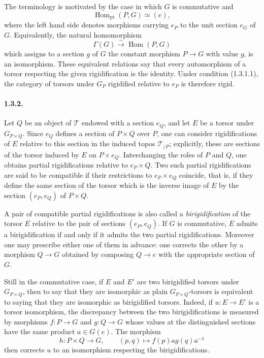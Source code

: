 \documentclass[11pt]{article}
\theoremstyle{plain}
\theoremstyle{definition}
\theoremstyle{remark}
\DeclareMathOperator{\Hom}{Hom}
\begin{document}
The terminology is motivated by the case in which $G$ is commutative and
\begin{equation}
\Hom_{\mathrm{pt}}(P,G)\simeq (e),
\tag{1.3.1.1}
\end{equation}
where the left hand side denotes morphisms carrying $e_P$ to the unit section $e_G$ of $G$. Equivalently, the natural homomorphism
\begin{equation}
\Gamma(G)\xrightarrow{\sim}\Hom(P,G)
\tag{1.3.1.2}
\end{equation}
which assigns to a section $g$ of $G$ the constant morphism $P\to G$ with value $g$, is an isomorphism. These equivalent relations say that every automorphism of a torsor respecting the given rigidification is the identity. Under condition (1.3.1.1), the category of torsors under $G_P$ rigidified relative to $e_P$ is therefore rigid.

\paragraph{1.3.2.} Let $Q$ be an object of $\mathcal T$ endowed with a section $e_Q$, and let $E$ be a torsor under $G_{P\times Q}$. Since $e_Q$ defines a section of $P\times Q$ over $P$, one can consider rigidifications of $E$ relative to this section in the induced topos $\mathcal T_{/P}$; explicitly, these are sections of the torsor induced by $E$ on $P\times e_Q$. Interchanging the roles of $P$ and $Q$, one obtains partial rigidifications relative to $e_P\times Q$. Two such partial rigidifications are said to be compatible if their restrictions to $e_P\times e_Q$ coincide, that is, if they define the same section of the torsor which is the inverse image of $E$ by the section $(e_P,e_Q)$ of $P\times Q$.

A pair of compatible partial rigidifications is also called a \emph{birigidification} of the torsor $E$ relative to the pair of sections $(e_P,e_Q)$. If $G$ is commutative, $E$ admits a birigidification if and only if it admits the two partial rigidifications. Moreover one may prescribe either one of them in advance: one corrects the other by a morphism $Q\to G$ obtained by composing $Q\to e$ with the appropriate section of $G$.

Still in the commutative case, if $E$ and $E'$ are two birigidified torsors under $G_{P\times Q}$, then to say that they are isomorphic as plain $G_{P\times Q}$-torsors is equivalent to saying that they are isomorphic as birigidified torsors. Indeed, if $u:E\to E'$ is a torsor isomorphism, the discrepancy between the two birigidifications is measured by morphisms $f:P\to G$ and $g:Q\to G$ whose values at the distinguished sections have the same product $a\in G(e)$. The morphism
\[
 h:P\times Q\longrightarrow G,\qquad (p,q)\longmapsto f(p)a g(q)a^{-1}
\]
then corrects $u$ to an isomorphism respecting the birigidifications.
\end{document}

